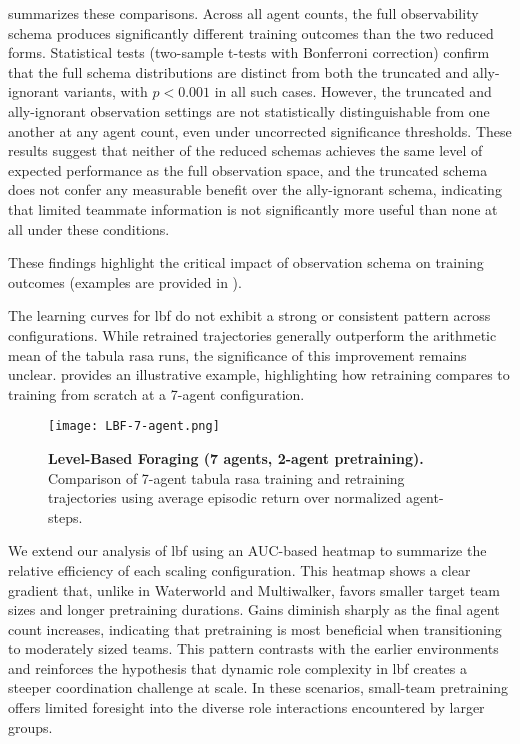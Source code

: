 \documentclass{article}
\begin{document}
 summarizes these comparisons. 
Across all agent counts, the full observability schema produces 
significantly different training outcomes than the two reduced forms. 
Statistical tests (two-sample t-tests with Bonferroni correction) 
confirm that the full schema distributions are distinct from both the 
truncated and ally-ignorant variants, with $p < 0.001$ in all such cases. 
However, the truncated and ally-ignorant observation settings are not 
statistically distinguishable from one another at any agent count, 
even under uncorrected significance thresholds. 
These results suggest that neither of 
the reduced schemas achieves the same level of 
expected performance as the full observation space, 
and the truncated schema does not confer any measurable 
benefit over the ally-ignorant schema, indicating 
that limited teammate information is not significantly 
more useful than none at all under these conditions.

These findings highlight the critical impact of observation schema on training outcomes
(examples are provided in ).

The learning curves for \gls{lbf} do not exhibit a strong or consistent 
pattern across configurations. While retrained trajectories 
generally outperform the arithmetic mean of the tabula rasa runs, 
the significance of this improvement remains unclear. 
 provides an illustrative example, highlighting how 
retraining compares to training from scratch at a 7-agent configuration.

\begin{figure}[!ht]
    \centering
    \texttt{[image: LBF-7-agent.png]}
    \caption{\textbf{Level-Based Foraging (7 agents, 2-agent pretraining).} Comparison of 
    7-agent tabula rasa training and retraining trajectories using average 
    episodic return over normalized agent-steps.}
    \label{con1:fig:lbf-7}
\end{figure}

We extend our analysis of \gls{lbf} using an AUC-based heatmap to summarize the 
relative efficiency of each scaling configuration. 
This heatmap shows a clear gradient that, unlike in Waterworld and Multiwalker, 
favors smaller target team sizes and longer pretraining durations. 
Gains diminish sharply as the final agent count increases, 
indicating that pretraining is most beneficial when transitioning to moderately sized teams. 
This pattern contrasts with the earlier environments and reinforces the hypothesis that 
dynamic role complexity in \gls{lbf} creates a steeper coordination challenge at scale. 
In these scenarios, small-team pretraining offers limited foresight into the diverse role 
interactions encountered by larger groups.
\end{document}
